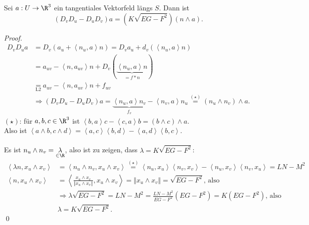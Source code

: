 \begin{lemma}
  Sei $ a: U \to \R^3 $ ein tangentiales Vektorfeld längs $ S $. Dann ist
  \begin{equation*}
    (D_vD_u-D_uD_v)a = (K\sqrt{EG - F^2})(n \wedge a)\text{.}
  \end{equation*}
  \begin{proof}
    \
    \begin{align*}
      D_vD_ua &= D_v(a_u + \left\langle n_u,a \right\rangle n) = D_va_u + d_v(\left\langle n_u,a \right\rangle n) \\
       &= a_{uv} - \left\langle n,a_{uv} \right\rangle n + D_v(\underbrace{\left\langle n_u,a \right\rangle n}_{=f*n}) \\
       &\underset{\text{L2}}{=} a_{uv} - \left\langle n,a_{uv} \right\rangle n + f_{uv} \\
       &\Rightarrow (D_vD_u - D_uD_v)a = \underbrace{\left\langle n_u,a \right\rangle n_v}_{f_v} - \left\langle n_v,a \right\rangle n_u \overset{(\star)}{=} (n_u \wedge n_v)\wedge a\text{.}
    \end{align*}
    $ (\star) $: für $ a,b,c \in \R^3 $ ist $ \left\langle b,a \right\rangle c - \left\langle c,a \right\rangle b = (b \wedge c) \wedge a $. \\ Also ist $ \left\langle a \wedge b, c \wedge d \right\rangle = \left\langle a, c \right\rangle \left\langle b, d \right\rangle - \left\langle a, d \right\rangle \left\langle b, c \right\rangle $. \\
    \ \\
    Es ist $ n_u \wedge n_v = \underset{\in \R}{\lambda} $, also ist zu zeigen, dass $ \lambda = K\sqrt{EG - F^2} $:
    \begin{align*}
      \left\langle \lambda n, x_u \wedge x_v \right\rangle &= \left\langle n_u \wedge n_v, x_u \wedge x_v \right\rangle \overset{(\star)}{=} \left\langle n_u, x_u \right\rangle \left\langle n_v, x_v \right\rangle - \left\langle n_u, x_v \right\rangle \left\langle n_v,x_u \right\rangle = LN - M^2 \\
      \left\langle n, x_u \wedge x_v \right\rangle &= \left\langle \frac{x_u \wedge x_v}{\left\Vert x_u \wedge x_v \right\Vert}, x_u \wedge x_v \right\rangle = \left\Vert x_u \wedge x_v \right\Vert = \sqrt{EG - F^2}\text{, also} \\
      &\Rightarrow \lambda \sqrt{EG - F^2} = LN - M^2 = \frac{LN - M^2}{EG - F^2}(EG - F^2) = K(EG - F^2)\text{, also} \\
      &\lambda = K\sqrt{EG - F^2}\text{.}
    \end{align*} \qed
  \end{proof}
\end{lemma}

